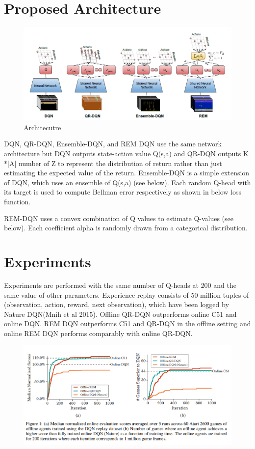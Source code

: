 \documentclass{article}
\begin{document}
\section{Proposed Architecture}

\begin{figure}[H]
  \centering
    \includegraphics[width=0.5\linewidth]{arch.png}
  \caption{Architecutre}
\end{figure}

DQN, QR-DQN, Ensemble-DQN, and REM DQN use the same network architecture but DQN outputs state-action value Q(s,a) and QR-DQN outputs K *|A| number of Z to represent the distribution of return rather than just estimating the expected value of the return. Ensemble-DQN is a simple extension of DQN, which uses an ensemble of Q(s,a) (see below). Each random Q-head with its target is used to compute Bellman error respectively as shown in below loss function.

REM-DQN uses a convex combination of Q values to estimate Q-values (see below). Each coefficient alpha is randomly drawn from a categorical distribution.

\section{Experiments}
Experiments are performed with the same number of Q-heads at 200 and the same value of other parameters. Experience replay consists of 50 million tuples of (observation, action, reward, next observation), which have been logged by Nature DQN(Mnih et al 2015). Offline QR-DQN outperforms online C51 and online DQN. REM DQN outperforms C51 and QR-DQN in the offline setting and online REM DQN performs comparably with online QR-DQN.


\begin{figure}[H]
  \centering
    \includegraphics[width=0.6\linewidth]{3.png}
\end{figure}
\end{document}
